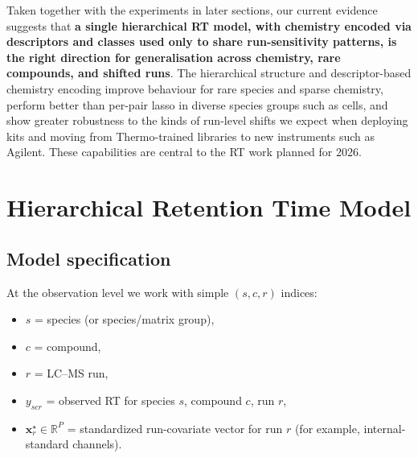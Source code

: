 \documentclass[11pt]{article}
\begin{document}
Taken together with the experiments in later sections, our current evidence suggests
that \textbf{a single hierarchical RT model, with chemistry encoded via descriptors
and classes used only to share run-sensitivity patterns, is the right direction for
generalisation across chemistry, rare compounds, and shifted runs}. The hierarchical
structure and descriptor-based chemistry encoding improve behaviour for rare species
and sparse chemistry, perform better than per-pair lasso in diverse species groups
such as cells, and show greater robustness to the kinds of run-level shifts we expect
when deploying kits and moving from Thermo-trained libraries to new instruments such
as Agilent. These capabilities are central to the RT work planned for 2026.

\section{Hierarchical Retention Time Model}

\subsection{Model specification}

At the observation level we work with simple $(s,c,r)$ indices:
\begin{itemize}
  \item $s$ = species (or species/matrix group),
  \item $c$ = compound,
  \item $r$ = LC--MS run,
  \item $y_{scr}$ = observed RT for species $s$, compound $c$, run $r$,
  \item $\bm{x}^{\star}_{r}\in\mathbb{R}^P$ = standardized run-covariate vector for run $r$
        (for example, internal-standard channels).
\end{itemize}
\end{document}
